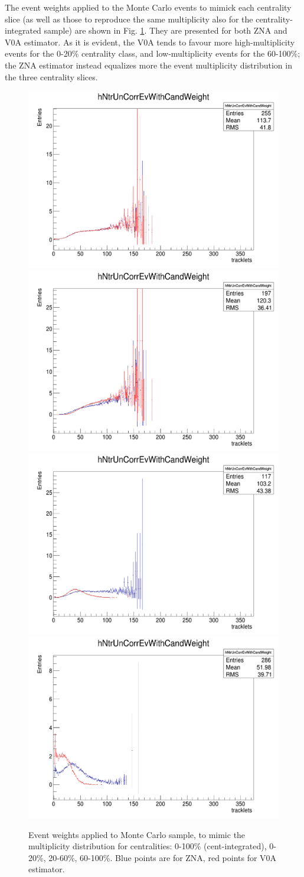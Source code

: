 The event weights applied to the Monte Carlo events to mimick each centrality slice (as well as those to reproduce the same multiplicity also for the centrality-integrated sample) are shown in Fig. \ref{fig:Weights}. They are presented for both ZNA and V0A estimator. As it is evident, the V0A tends to favour more high-multiplicity events for the 0-20\% centrality class, and low-multiplicity events for the 60-100\%; the ZNA estimator instead equalizes more the event multiplicity distribution in the three centrality slices.

\begin{figure}
\centering
{\includegraphics[width=0.4\linewidth]{figuresVsCent/Global/Weight0100.png}}
{\includegraphics[width=0.4\linewidth]{figuresVsCent/Global/Weight020.png}} \\
{\includegraphics[width=0.4\linewidth]{figuresVsCent/Global/Weight2060.png}}
{\includegraphics[width=0.4\linewidth]{figuresVsCent/Global/Weight60100.png}}
 \caption{Event weights applied to Monte Carlo sample, to mimic the multiplicity distribution for centralities: 0-100\% (cent-integrated), 0-20\%, 20-60\%, 60-100\%. Blue points are for ZNA, red points for V0A estimator.}
\label{fig:Weights}
\end{figure}

